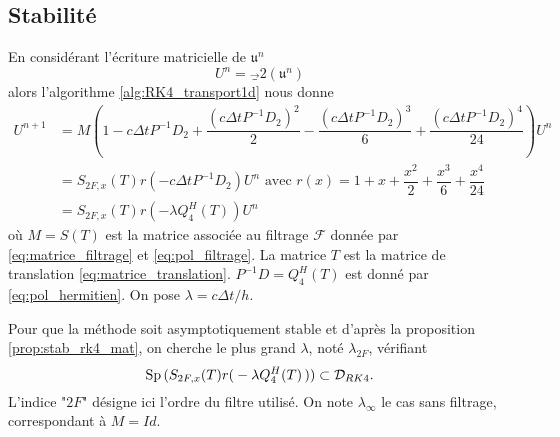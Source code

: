 \subsection{Stabilité}

En considérant l'écriture matricielle de $\mathfrak{u}^n$
\begin{equation}
U^n = \vec_2(\mathfrak{u}^n)
\end{equation}
alors l'algorithme \ref{alg:RK4_transport1d} nous donne
\begin{align*}
U^{n+1} & = M \left( 1 - c \Delta t P^{-1}D_2 + \dfrac{(c \Delta t P^{-1}D_2)^2}{2} - \dfrac{(c \Delta t P^{-1}D_2)^3}{6} + \dfrac{(c \Delta t P^{-1}D_2)^4}{24} \right) U^n \\
		& = S_{2F,x}(T) r(- c \Delta t P^{-1}D_2) U^n \text{ avec } r(x)=1+x+\dfrac{x^2}{2}+\dfrac{x^3}{6}+\dfrac{x^4}{24}\\
		& = S_{2F,x}(T) r \left( -\lambda Q_{4}^H(T) \right) U^n
\end{align*}
où $M=S(T)$ est la matrice associée au filtrage $\mathcal{F}$ donnée par \eqref{eq:matrice_filtrage} et \eqref{eq:pol_filtrage}. La matrice $T$ est la matrice de translation \eqref{eq:matrice_translation}. $P^{-1}D = Q_4^H(T)$ est donné par \eqref{eq:pol_hermitien}. On pose $\lambda = c \Delta t / h$.

Pour que la méthode soit asymptotiquement stable et d'après la proposition \ref{prop:stab_rk4_mat}, on cherche le plus grand $\lambda$, noté $\lambda_{2F}$, vérifiant
\begin{equation}
\text{Sp} \left( S_{2F,x}(T) r \right( -\lambda Q_{4}^H(T) \left) \right) \subset \mathcal{D}_{RK4}.
\end{equation}
L'indice "$2F$" désigne ici l'ordre du filtre utilisé. On note $\lambda_{\infty}$ le cas sans filtrage, correspondant à $M=Id$.

